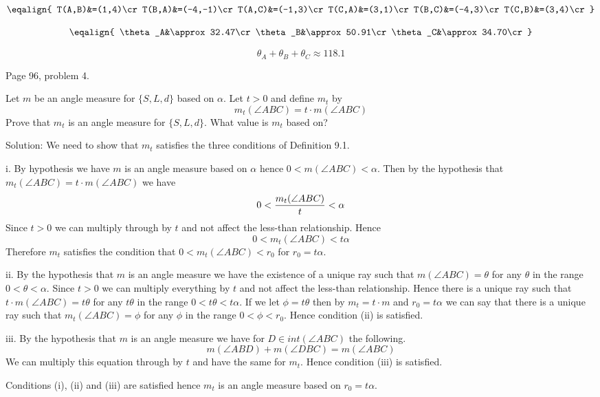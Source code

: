 \bigskip
\noindent
$$\eqalign{
T(A,B)&=(1,4)\cr
T(B,A)&=(-4,-1)\cr
T(A,C)&=(-1,3)\cr
T(C,A)&=(3,1)\cr
T(B,C)&=(-4,3)\cr
T(C,B)&=(3,4)\cr
}$$

\bigskip
$$\eqalign{
\theta_A&\approx32.47\cr
\theta_B&\approx50.91\cr
\theta_C&\approx34.70\cr
}$$

\bigskip
$$\theta_A+\theta_B+\theta_C\approx118.1$$

\vfill
\eject

\beginsection Page 96, problem 4.

Let $m$ be an angle measure for $\{S,L,d\}$ based on $\alpha$.
Let $t>0$ and define $m_t$ by
$$m_t(\angle ABC)=t\cdot m(\angle ABC)$$
Prove that $m_t$ is an angle measure for $\{S,L,d\}$.
What value is $m_t$ based on?

\bigskip
\noindent
Solution: We need to show that $m_t$ satisfies the three conditions of Definition 9.1.

\medskip
\item{i.} 
By hypothesis we have $m$ is an angle measure based on $\alpha$ hence $0<m(\angle ABC)<\alpha$.
Then by the hypothesis that $m_t(\angle ABC)=t\cdot m(\angle ABC)$ we have
$$0<{m_t(\angle ABC)\over t}<\alpha$$
Since $t>0$ we can multiply through by $t$ and not affect the less-than relationship.
Hence
$$0<m_t(\angle ABC)<t\alpha$$
Therefore $m_t$ satisfies the condition that $0<m_t(\angle ABC)<r_0$ for $r_0=t\alpha$.

\medskip
\item{ii.}
By the hypothesis that $m$ is an angle measure we have the existence of
a unique ray such that $m(\angle ABC)=\theta$
for any $\theta$ in the range $0<\theta<\alpha$.
Since $t>0$ we can multiply everything by $t$ and not affect the less-than relationship.
Hence there is a unique ray
such that $t\cdot m(\angle ABC)=t\theta$ for any $t\theta$ in the range $0<t\theta<t\alpha$.
If we let $\phi=t\theta$ then by $m_t=t\cdot m$ and $r_0=t\alpha$
we can say that there is a unique ray
such that $m_t(\angle ABC)=\phi$ for any $\phi$ in the range $0<\phi<r_0$.
Hence condition (ii) is satisfied.

\medskip
\item{iii.}
By the hypothesis that $m$ is an angle measure we have for $D\in int(\angle ABC)$ the
following.
$$m(\angle ABD)+m(\angle DBC)=m(\angle ABC)$$
We can multiply this equation through by $t$ and have the same for $m_t$.
Hence condition (iii) is satisfied.

\medskip
\noindent
Conditions (i), (ii) and (iii) are satisfied hence $m_t$ is an angle measure based on
$r_0=t\alpha$.

